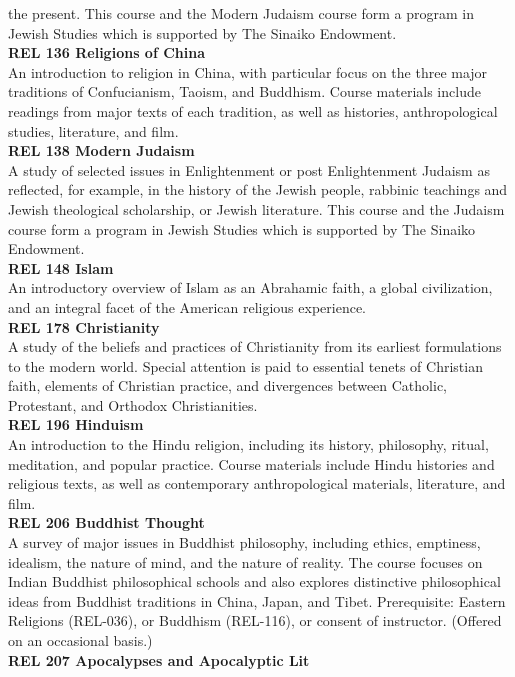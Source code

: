 \documentclass[
  letterpaper,
]{scrbook}
\begin{document}
the present. This course and the Modern Judaism course form a program in
Jewish Studies which is supported by The Sinaiko Endowment.\\
\textbf{REL 136 Religions of China}\\
An introduction to religion in China, with particular focus on the three
major traditions of Confucianism, Taoism, and Buddhism. Course materials
include readings from major texts of each tradition, as well as
histories, anthropological studies, literature, and film.\\
\textbf{REL 138 Modern Judaism}\\
A study of selected issues in Enlightenment or post Enlightenment
Judaism as reflected, for example, in the history of the Jewish people,
rabbinic teachings and Jewish theological scholarship, or Jewish
literature. This course and the Judaism course form a program in Jewish
Studies which is supported by The Sinaiko Endowment.\\
\textbf{REL 148 Islam}\\
An introductory overview of Islam as an Abrahamic faith, a global
civilization, and an integral facet of the American religious
experience.\\
\textbf{REL 178 Christianity}\\
A study of the beliefs and practices of Christianity from its earliest
formulations to the modern world. Special attention is paid to essential
tenets of Christian faith, elements of Christian practice, and
divergences between Catholic, Protestant, and Orthodox Christianities.\\
\textbf{REL 196 Hinduism}\\
An introduction to the Hindu religion, including its history,
philosophy, ritual, meditation, and popular practice. Course materials
include Hindu histories and religious texts, as well as contemporary
anthropological materials, literature, and film.\\
\textbf{REL 206 Buddhist Thought}\\
A survey of major issues in Buddhist philosophy, including ethics,
emptiness, idealism, the nature of mind, and the nature of reality. The
course focuses on Indian Buddhist philosophical schools and also
explores distinctive philosophical ideas from Buddhist traditions in
China, Japan, and Tibet. Prerequisite: Eastern Religions (REL-036), or
Buddhism (REL-116), or consent of instructor. (Offered on an occasional
basis.)\\
\textbf{REL 207 Apocalypses and Apocalyptic Lit}\\
\end{document}
